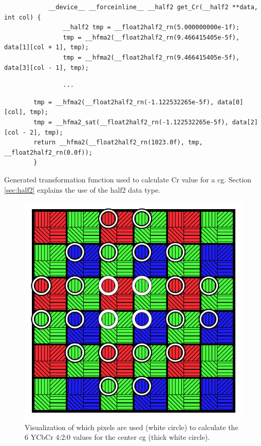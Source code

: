 \begin{listing}[H]
    \begin{verbatim}
            __device__ __forceinline__ __half2 get_Cr(__half2 **data, int col) {
                __half2 tmp = __float2half2_rn(5.000000000e-1f);
                tmp = __hfma2(__float2half2_rn(9.466415405e-5f), data[1][col + 1], tmp);
                tmp = __hfma2(__float2half2_rn(9.466415405e-5f), data[3][col - 1], tmp);
            \end{verbatim}
    \vspace{-28pt}
    \begin{verbatim}
                ...
            \end{verbatim}
    \vspace{-28pt}
    \begin{verbatim}
        tmp = __hfma2(__float2half2_rn(-1.122532265e-5f), data[0][col], tmp);
        tmp = __hfma2_sat(__float2half2_rn(-1.122532265e-5f), data[2][col - 2], tmp);
        return __hfma2(__float2half2_rn(1023.0f), tmp, __float2half2_rn(0.0f));
        }
    \end{verbatim}
    \caption{Generated transformation function used to calculate Cr value for a \gls{cg}.
        Section \ref{sec:half2} explains the use of the \gls{half2} data type.}
    \label{listing:generated_function}
\end{listing}
\begin{figure}[H]
    \centering
    \includegraphics[width=.35\textwidth]{figures/polarized_image/normal_conv.pdf}
    \caption{Visualization of which pixels are used (white circle) to calculate the 6 YCbCr 4:2:0 values for the center \gls{cg} (thick white circle).}
    \label{fig:transformation}
\end{figure}